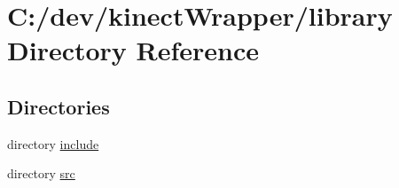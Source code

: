 \section{C\+:/dev/kinect\+Wrapper/library Directory Reference}
\label{dir_e3d620c6b6fdb93ed3bc6186215bde2e}
\subsection*{Directories}
\begin{DoxyCompactItemize}
\item 
directory \hyperlink{dir_9bb0cdb2fc6936e925cffa69d90b0c80}{include}
\item 
directory \hyperlink{dir_255fa8f554e95a439f260058328638ab}{src}
\end{DoxyCompactItemize}
